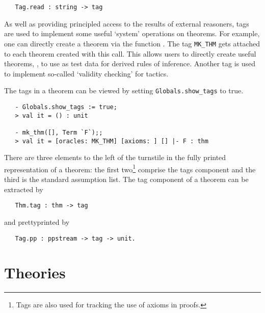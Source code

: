 \begin{holboxed}
\begin{verbatim}
   Tag.read : string -> tag
\end{verbatim}
\end{holboxed}

As well as providing principled access to the results of external
reasoners, tags are used to implement some useful `system' operations
on theorems. For example, one can directly create a theorem via the
function . The tag \verb+MK_THM+ gets attached to each
theorem created with this call. This allows users to directly create
useful theorems, \eg, to use as test data for derived rules of
inference.  Another tag is used to implement so-called `validity
checking' for tactics.

The tags in a theorem can be viewed by setting \verb+Globals.show_tags+ to
true.

\setcounter{sessioncount}{0}
\begin{session}
\begin{verbatim}
   - Globals.show_tags := true;
   > val it = () : unit

   - mk_thm([], Term `F`);;
   > val it = [oracles: MK_THM] [axioms: ] [] |- F : thm
\end{verbatim}
\end{session}

There are three elements to the left of the turnstile in the fully printed
representation of a theorem: the first two\footnote{Tags are also used for
tracking the use of axioms in proofs.} comprise the tags component and the
third is the standard assumption list. The tag component of a theorem
can be extracted by

\begin{holboxed}
\begin{verbatim}
   Thm.tag : thm -> tag
\end{verbatim}
\end{holboxed}

\noindent and prettyprinted by

\begin{holboxed}
\begin{verbatim}
   Tag.pp : ppstream -> tag -> unit.
\end{verbatim}
\end{holboxed}


\section{Theories}
\label{theoryfns}

